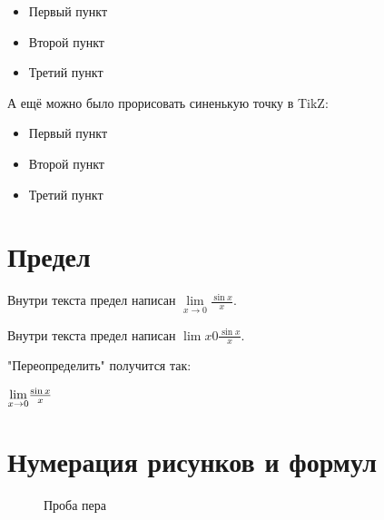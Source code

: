 \documentclass[12pt, a4paper]{article}
\theoremstyle{plain}              %
\theoremstyle{definition}         %
\begin{document}
\renewcommand{\labelitemi}{\LARGE{\textcolor{blue}{\textbullet}}}

\begin{itemize}
\item Первый пункт
\item Второй пункт
\item Третий пункт
\end{itemize}

А ещё можно было прорисовать синенькую точку в TikZ:

\newcommand*{\MyPoint}{\tikz \draw [fill=blue,draw=blue] circle (2.5pt);}
\renewcommand{\labelitemi}{\MyPoint}

\begin{itemize}
\item Первый пункт
\item Второй пункт
\item Третий пункт
\end{itemize}


\section{Предел}

\newcommand{\llim}[2]{\lim\limits_{{#1}\to{#2}}}

Внутри текста предел написан  $ \llim{x}{0} \frac{\sin{x}}{x}$.


Внутри текста предел написан  $ \lim{x}{0} \frac{\sin{x}}{x}$.


"Переопределить" получится так:

\renewcommand{\lim}{\underset{x \to 0}{\qopname \relax m{lim}}{\frac{\sin{x}}{x}}}



$\lim$



\section{Нумерация рисунков и формул}


\renewcommand{\thefigure}{\thesection:\arabic{figure}}    

\begin{figure}[H]
\center {} 
\caption{Проба пера}
\end{figure}
\end{document}
